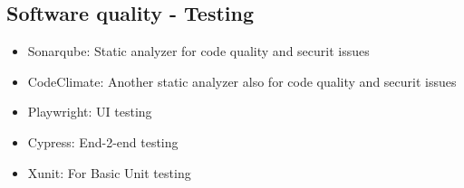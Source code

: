\subsection*{Software quality - Testing}

\begin{itemize}
	\item Sonarqube: Static analyzer for code quality and securit issues
	\item CodeClimate: Another static analyzer also for code quality and securit issues
	\item Playwright: UI testing
	\item Cypress: End-2-end testing
	\item Xunit: For Basic Unit testing
\end{itemize}

